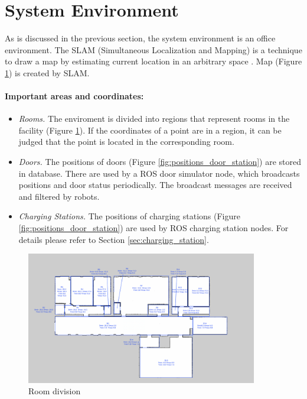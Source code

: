 \section{System Environment}
\label{sec:system_enviroment}
As is discussed in the previous section, the system environment is an office environment. The SLAM (Simultaneous Localization and Mapping) is a technique to draw a map by estimating current location in an arbitrary space \cite{slam}. Map (Figure \ref{fig:room_division}) is created by SLAM.

\paragraph{Important areas and coordinates:}
\begin{itemize}
	\item \textsl{Rooms.} The enviroment is divided into regions that represent rooms in the facility (Figure \ref{fig:room_division}). If the coordinates of a point are in a region, it can be judged that the point is located in the corresponding room.
	\item \textsl{Doors.} The positions of doors (Figure \ref{fig:positions_door_station}) are stored in database. There are used by a ROS door simulator node, which broadcasts positions and door status periodically. The broadcast messages are received and filtered by robots.
	\item \textsl{Charging Stations.} The positions of charging stations (Figure \ref{fig:positions_door_station}) are used by ROS charging station nodes. For details please refer to Section \ref{sec:charging_station}.
\end{itemize}

\begin{figure}[htbp]
	\centering
	\includegraphics[width = 0.9\textwidth]{content/images/ch3/room_division.png}
	\caption{Room division}
	\label{fig:room_division}
\end{figure}

